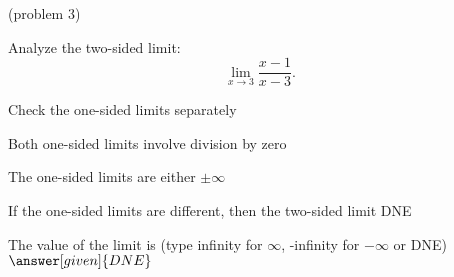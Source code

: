 \documentclass{ximera}
\begin{document}
\begin{problem}(problem 3)
  
	Analyze the two-sided limit:
  \[
  \lim_{x \to 3} \frac{x-1}{x-3}.
  \]
  
    \begin{hint}
      Check the one-sided limits separately
    \end{hint}
    \begin{hint}
      Both one-sided limits involve division by zero
    \end{hint}
    \begin{hint}
      The one-sided limits are either $\pm \infty$
    \end{hint}
		\begin{hint}
		  If the one-sided limits are different, then the two-sided limit DNE
		\end{hint}	
		The value of the limit is
		(type infinity for $\infty$, -infinity for $-\infty$ or DNE)
		 $\answer[given]{DNE}$
		
\end{problem}
\end{document}
